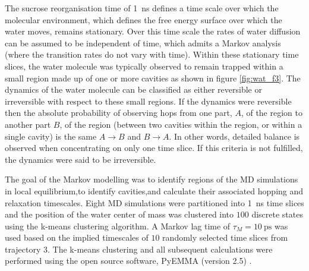 The sucrose reorganisation time of \SI{1}{\nano\second} defines a time scale over which the molecular environment, which defines the free energy surface over which the water moves, remains stationary.  Over this time scale the rates of water diffusion can be assumed to be independent of time, which admits a Markov analysis (where the transition rates do not vary with time).  Within these stationary time slices, the water molecule was typically observed to remain trapped within a small region made up of one or more cavities as shown in figure \ref{fig:wat_f3}.  The dynamics of the water molecule can be classified as either reversible or irreversible with respect to these small regions.  If the dynamics were reversible then the absolute probability of observing hops from one part, $A$, of the region to another part $B$, of the region (between two cavities within the region, or within a single cavity) is the same $A\rightarrow B$ and $B\rightarrow A$. In other words, detailed balance is observed when concentrating on only one time slice.  If this criteria is not fulfilled, the dynamics were said to be irreversible. 

The goal of the Markov modelling was to identify regions of the MD simulations in local equilibrium,to identify cavities,and calculate their associated hopping and relaxation timescales. Eight MD simulations were partitioned into \SI{1}{\nano\second} time slices and the position of the water center of mass was clustered into $100$ discrete states using the k-means \cite{lloydLeastSquaresQuantization1982} clustering algorithm. A Markov lag time of $\tau_{M} = \SI{10}{\pico\second}$ was used based on the implied timescales of $10$ randomly selected time slices from trajectory \num{3}.  The k-means clustering and all subsequent calculations were performed using the open source software, PyEMMA (version 2.5) \cite{schererPyEMMASoftwarePackage2015a}. 

